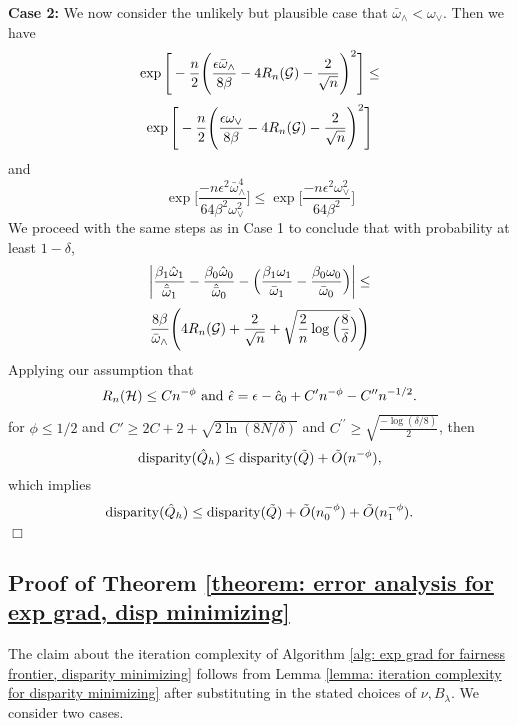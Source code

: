 \documentclass{article}
\begin{document}
\textbf{Case 2: } We now consider the unlikely but plausible case that $\bar{\omega}_{\wedge} < \omega_{\vee}$.
Then we have 
\[
\exp\Bigg[-\frac{n}{2}\Bigg(\frac{\epsilon \bar{\omega}_{\wedge}}{8\beta}  - 4 R_n(\mathcal{G}) - \frac{2}{\sqrt{n}}\Bigg)^2 \Bigg]  \leq
\]
\[
 \exp\Bigg[-\frac{n}{2}\Bigg(\frac{\epsilon \omega_{\vee}}{8\beta}  - 4 R_n(\mathcal{G}) - \frac{2}{\sqrt{n}}\Bigg)^2 \Bigg] 
\]
and 
\begin{equation*}
\exp \Big[\frac{-n \epsilon^2 \bar{\omega}_{\wedge}^4}{64\beta^2\omega_{\vee}^2} \Big] \leq \exp \Big[\frac{-n \epsilon^2 \omega_{\vee}^2}{64\beta^2} \Big]
\end{equation*}
We proceed with the same steps as in Case 1 to conclude that 
with probability at least $1- \delta$,
\[
\left| \frac{\beta_1 \hat{\omega}_1 }{\hat{\bar{\omega}}_1} - \frac{\beta_0 \hat{\omega}_0}{\hat{\bar{\omega}}_0} -  \Big(\frac{\beta_1 \omega_1}{\bar{\omega}_1} - \frac{\beta_0 \omega_0}{\bar{\omega}_0} \Big) \right| \leq
\]
\[
\frac{8\beta}{\bar{\omega}_{\wedge}}\Bigg( 4 R_n(\mathcal{G}) + \frac{2}{\sqrt{n}} +\sqrt{\frac{2}{n}\log\Big(\frac{8}{\delta}}\Big)  \Bigg)
\]
Applying our assumption that 
    \[
    R_n(\mathcal{H}) \leq C n^{-\phi} \mbox{ and } \hat{\epsilon} = \epsilon - \hat{c}_0 + C^\prime n^{-\phi} - C^{\prime \prime} n^{-1/2}.
    \]
for  $\phi \leq 1/2$  and $C' \geq 2C + 2 + \sqrt{2 \ln(8 N/\delta)}$ and $C^{\prime \prime} \geq \sqrt{\frac{-\log(\delta / 8)}{2}}$, then
\begin{equation}
    \operatorname{disparity}(\hat{Q}_h) \leq \operatorname{disparity}(\tilde{Q}) + \tilde{O}(n^{-\phi}),
\end{equation} which implies 
\begin{equation}
    \operatorname{disparity}(\hat{Q}_h) \leq \operatorname{disparity}(\tilde{Q}) + \tilde{O}(n_0^{-\phi}) + \tilde{O}(n_1^{-\phi}).
\end{equation}
$\Box$

\subsection*{Proof of Theorem \ref{theorem: error analysis for exp grad, disp minimizing}}

The claim about the iteration complexity of Algorithm \ref{alg: exp grad for fairness frontier, disparity minimizing} follows from Lemma \ref{lemma: iteration complexity for disparity minimizing} after substituting in the stated choices of $\nu, B_\lambda$. We consider two cases.
        
\end{document}
